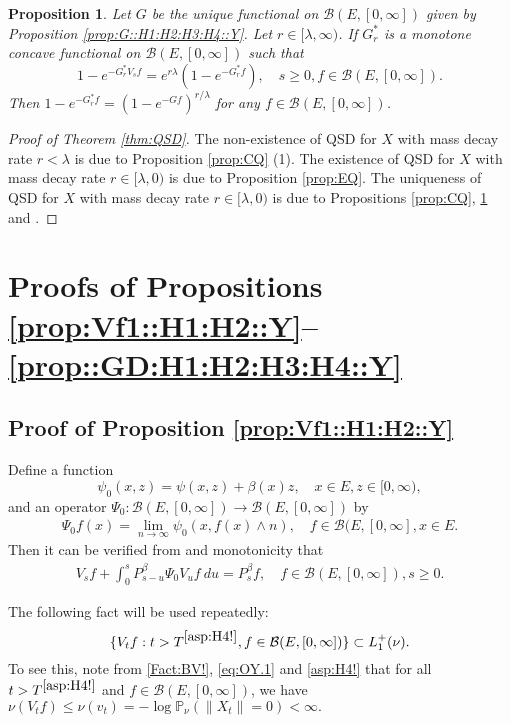 \documentclass[12pt,a4paper]{amsart}
\numberwithin{equation}{section}
\theoremstyle{plain}
\newtheorem{prop}[thm]{Proposition}
\theoremstyle{definition}
\theoremstyle{remark}
\begin{document}
\begin{prop} \label{prop:UC}
	Let $G$ be the unique functional on $\mathcal B(E,[0,\infty])$ given by Proposition \ref{prop:G::H1:H2:H3:H4::Y}.
	Let $r \in [\lambda, \infty)$. 
	If $G^*_r$ is a monotone concave functional on $\mathcal B(E,[0,\infty])$ such that
	\[
	1 - e^{-G^*_r V_s f} = e^{r\lambda }(1- e^{- G^*_r f}), \quad s\geq 0, f\in \mathcal B(E,[0,\infty]).
	\]
	Then $1 - e^{-G^*_rf} = (1 - e^{- G f})^{r/\lambda}$ for any $f\in \mathcal B(E,[0,\infty])$.  
\end{prop}

\begin{proof}[Proof of Theorem \ref{thm:QSD}]
	The non-existence of QSD for $X$ with mass decay rate $r < \lambda$ is due to Proposition \ref{prop:CQ} (1).
	The existence of QSD for $X$ with mass decay rate $r \in [\lambda,0)$ is due to Proposition \ref{prop:EQ}.
	The uniqueness of QSD for $X$ with mass decay rate $r\in [\lambda , 0)$ is due to Propositions \ref{prop:CQ}, \ref{prop:UC} and \cite[Theorem 1.17]{Li2011MeasureValued}.
\end{proof}

\section{Proofs of Propositions \ref{prop:Vf1::H1:H2::Y}--\ref{prop::GD:H1:H2:H3:H4::Y}}
\subsection{Proof of Proposition \ref{prop:Vf1::H1:H2::Y}} \label{sec:Vf1}
	Define a function
\[
	\psi_0(x,z) = \psi(x,z)+ \beta(x) z, \quad x\in E, z\in [0,\infty),
\]	
	and an operator $\Psi_0: \mathcal B(E, [0,\infty]) \to \mathcal B(E,[0,\infty])$ by 
\begin{align}
	\Psi_0 f(x)
	= \lim_{n\to \infty} \psi_0(x,f(x) \wedge n),
	\quad f\in \mathcal B(E,[0,\infty], x\in E.
\end{align}
	Then it can be verified from \cite[Theorem 2.23]{Li2011MeasureValued} and monotonicity that
\begin{align}\label{eq:Vf1.1}
	V_s f + \int_0^s P_{s-u}^\beta \Psi_0 V_{u} f ~du
	= P_s^\beta f,
	\quad f\in \mathcal B(E,[0,\infty]), s\geq 0.
\end{align}

	The following fact will be used repeatedly:
\begin{equation} \label{lem:nV::H2::Vf1}
	\{V_tf:t> T^{\eqref{asp:H4!}}, f\in \mathcal B(E, [0,\infty])\}\subset L_1^+(\nu).
\end{equation}
	To see this, note from \eqref{Fact:BV!}, \eqref{eq:OY.1} and \eqref{asp:H4!} that for  all $t> T^{\eqref{asp:H4!}}$ and $f\in \mathcal B(E,[0,\infty])$, we have $\nu(V_t f) \leq \nu(v_t)   = - \log \mathbb P_\nu (\|X_t\| = 0)  < \infty. $
\end{document}
